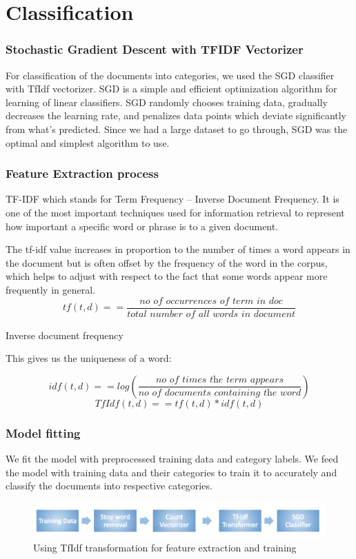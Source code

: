 \documentclass[paper=a4, fontsize=11pt]{scrartcl}
\numberwithin{equation}{section}		%
\numberwithin{figure}{section}			%
\numberwithin{table}{section}				%
\begin{document}
\section{Classification}
\subsubsection {Stochastic Gradient Descent with TFIDF Vectorizer}
For classification of the documents into categories, we used the SGD classifier with TfIdf vectorizer. SGD is a simple and efficient optimization algorithm for learning of linear classifiers.
SGD randomly chooses training data, gradually decreases the learning rate, and penalizes data points which deviate significantly from what's predicted. Since we had a large dataset to go through, SGD was the optimal and simplest algorithm to use.

\subsubsection{Feature Extraction process}
TF-IDF which stands for Term Frequency – Inverse Document Frequency. It is one of the most important techniques used for information retrieval to represent how important a specific word or phrase is to a given document.

The tf-idf value increases in proportion to the number of times a word appears in the document but is often offset by the frequency of the word in the corpus, which helps to adjust with respect to the fact that some words appear more frequently in general.
\[tf(t,d) =  = \frac{\textit{no of occurrences of term in doc} }{\textit{total number of all words in document}}\]
\item Inverse document frequency

 This gives us the uniqueness of a word:

 \[idf(t,d) =  = log(\frac{\textit{no of times the term appears} }{\textit{no of documents containing the word}})\]
  \[TfIdf(t,d) =  = tf(t,d) * idf(t,d)\]

\subsubsection{Model fitting}
We fit the model with preprocessed training data and category labels. We feed the model with training data and their categories to train it to accurately and classify the documents into respective categories.
\begin{figure}[ht]
	\centering
 	 \includegraphics[width=0.5\linewidth]{feature-extraction-blue.png}
	  \caption{Using TfIdf transformation for feature extraction and training }
 	 \label{fig:Similar Words for NRA}
\end{figure}
\end{document}
